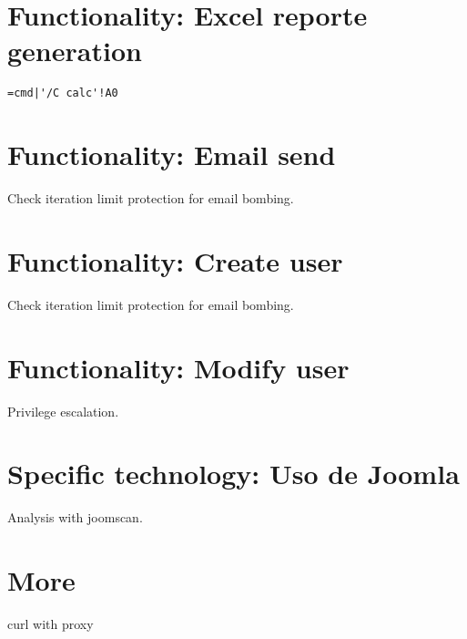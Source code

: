 \section{Functionality: Excel reporte generation}

\begin{lstlisting}[numbers=none]
	=cmd|'/C calc'!A0
\end{lstlisting}

\section{Functionality: Email send}

Check iteration limit protection for email bombing.

\section{Functionality: Create user}

Check iteration limit protection for email bombing.

\section{Functionality: Modify user}

Privilege escalation.

\section{Specific technology: Uso de Joomla}

Analysis with joomscan.

\section{More}

curl with proxy